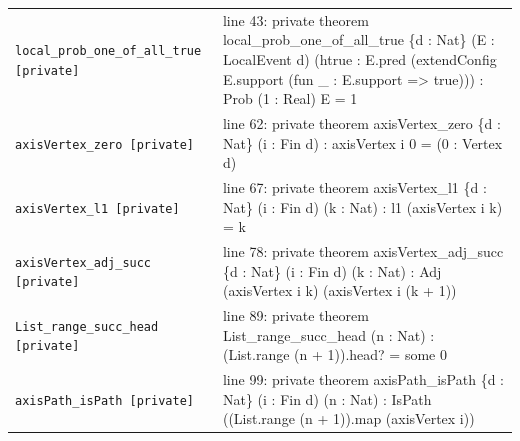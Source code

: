 \documentclass[10pt]{article}
\begin{document}
\begin{longtable}{>{\raggedright\arraybackslash}p{} >{\raggedright\arraybackslash}p{}}
\texttt{local\_\allowbreak{}prob\_\allowbreak{}one\_\allowbreak{}of\_\allowbreak{}all\_\allowbreak{}true [private]} & {\ttfamily\scriptsize line 43:\allowbreak{} private theorem local\_\allowbreak{}prob\_\allowbreak{}one\_\allowbreak{}of\_\allowbreak{}all\_\allowbreak{}true \{d :\allowbreak{} Nat\} (\allowbreak{}E :\allowbreak{} LocalEvent d)\allowbreak{} (\allowbreak{}htrue :\allowbreak{} E.\allowbreak{}pred (\allowbreak{}extendConfig E.\allowbreak{}support (\allowbreak{}fun \_\allowbreak{} :\allowbreak{} E.\allowbreak{}support =\allowbreak{}> true)\allowbreak{})\allowbreak{})\allowbreak{} :\allowbreak{} Prob (\allowbreak{}1 :\allowbreak{} Real)\allowbreak{} E =\allowbreak{} 1} \\[0.45em]
\texttt{axisVertex\_\allowbreak{}zero [private]} & {\ttfamily\scriptsize line 62:\allowbreak{} private theorem axisVertex\_\allowbreak{}zero \{d :\allowbreak{} Nat\} (\allowbreak{}i :\allowbreak{} Fin d)\allowbreak{} :\allowbreak{} axisVertex i 0 =\allowbreak{} (\allowbreak{}0 :\allowbreak{} Vertex d)\allowbreak{}} \\[0.45em]
\texttt{axisVertex\_\allowbreak{}l1 [private]} & {\ttfamily\scriptsize line 67:\allowbreak{} private theorem axisVertex\_\allowbreak{}l1 \{d :\allowbreak{} Nat\} (\allowbreak{}i :\allowbreak{} Fin d)\allowbreak{} (\allowbreak{}k :\allowbreak{} Nat)\allowbreak{} :\allowbreak{} l1 (\allowbreak{}axisVertex i k)\allowbreak{} =\allowbreak{} k} \\[0.45em]
\texttt{axisVertex\_\allowbreak{}adj\_\allowbreak{}succ [private]} & {\ttfamily\scriptsize line 78:\allowbreak{} private theorem axisVertex\_\allowbreak{}adj\_\allowbreak{}succ \{d :\allowbreak{} Nat\} (\allowbreak{}i :\allowbreak{} Fin d)\allowbreak{} (\allowbreak{}k :\allowbreak{} Nat)\allowbreak{} :\allowbreak{} Adj (\allowbreak{}axisVertex i k)\allowbreak{} (\allowbreak{}axisVertex i (\allowbreak{}k +\allowbreak{} 1)\allowbreak{})\allowbreak{}} \\[0.45em]
\texttt{List\_\allowbreak{}range\_\allowbreak{}succ\_\allowbreak{}head [private]} & {\ttfamily\scriptsize line 89:\allowbreak{} private theorem List\_\allowbreak{}range\_\allowbreak{}succ\_\allowbreak{}head (\allowbreak{}n :\allowbreak{} Nat)\allowbreak{} :\allowbreak{} (\allowbreak{}List.\allowbreak{}range (\allowbreak{}n +\allowbreak{} 1)\allowbreak{})\allowbreak{}.\allowbreak{}head? =\allowbreak{} some 0} \\[0.45em]
\texttt{axisPath\_\allowbreak{}isPath [private]} & {\ttfamily\scriptsize line 99:\allowbreak{} private theorem axisPath\_\allowbreak{}isPath \{d :\allowbreak{} Nat\} (\allowbreak{}i :\allowbreak{} Fin d)\allowbreak{} (\allowbreak{}n :\allowbreak{} Nat)\allowbreak{} :\allowbreak{} IsPath (\allowbreak{}(\allowbreak{}List.\allowbreak{}range (\allowbreak{}n +\allowbreak{} 1)\allowbreak{})\allowbreak{}.\allowbreak{}map (\allowbreak{}axisVertex i)\allowbreak{})\allowbreak{}} \\[0.45em]

\end{longtable}
\end{document}
